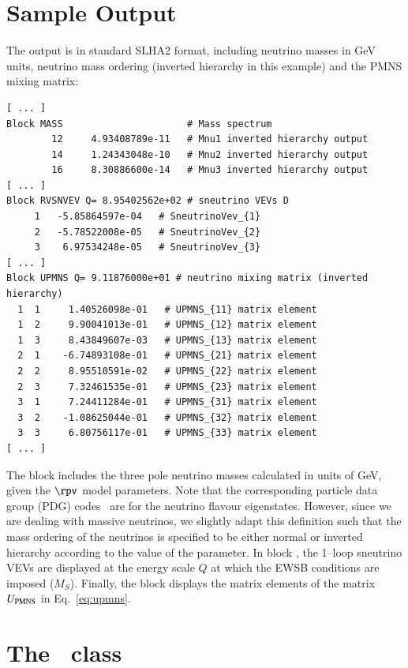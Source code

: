 \documentclass[pdflatex,final,3p,times]{elsarticle}
\begin{document}
\section{Sample Output \label{sec:output}}

The output is in standard SLHA2 format, including
neutrino masses in GeV units, neutrino mass 
ordering (inverted hierarchy 
in this example) and the PMNS mixing matrix: 
\small\begin{verbatim}
[ ... ]
Block MASS                      # Mass spectrum
        12     4.93408789e-11   # Mnu1 inverted hierarchy output
        14     1.24343048e-10   # Mnu2 inverted hierarchy output
        16     8.30886600e-14   # Mnu3 inverted hierarchy output
[ ... ]
Block RVSNVEV Q= 8.95402562e+02 # sneutrino VEVs D 
     1   -5.85864597e-04   # SneutrinoVev_{1}
     2   -5.78522008e-05   # SneutrinoVev_{2}
     3    6.97534248e-05   # SneutrinoVev_{3}
[ ... ]
Block UPMNS Q= 9.11876000e+01 # neutrino mixing matrix (inverted  hierarchy)
  1  1     1.40526098e-01   # UPMNS_{11} matrix element
  1  2     9.90041013e-01   # UPMNS_{12} matrix element
  1  3     8.43849607e-03   # UPMNS_{13} matrix element
  2  1    -6.74893108e-01   # UPMNS_{21} matrix element
  2  2     8.95510591e-02   # UPMNS_{22} matrix element
  2  3     7.32461535e-01   # UPMNS_{23} matrix element
  3  1     7.24411284e-01   # UPMNS_{31} matrix element
  3  2    -1.08625044e-01   # UPMNS_{32} matrix element
  3  3     6.80756117e-01   # UPMNS_{33} matrix element
[ ... ]
\end{verbatim}\normalsize

The block  includes the three pole neutrino masses
calculated in units of GeV, given the $\rpv$ model parameters.
Note that the corresponding particle data group (PDG) codes~\cite{pdg} are for
the 
neutrino flavour eigenstates. However, since we  
are dealing with massive neutrinos, we slightly adapt this definition such that the mass ordering of the
neutrinos is specified to be either normal or inverted hierarchy according to the value of the 
 parameter.
In block , the 1--loop sneutrino VEVs are displayed at the energy scale $Q$ at which 
the EWSB conditions are imposed ($M_S$).
Finally, the block  displays the matrix elements of the matrix
$U_{\rm PMNS}$ in Eq.~\ref{eq:upmns}.


\section{The ~class\label{sec:objects}}
\end{document}
